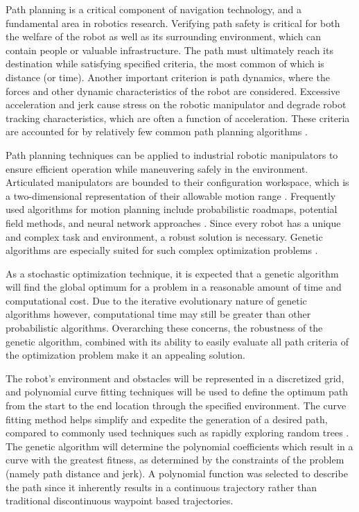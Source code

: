 Path planning is a critical component of navigation technology, and a fundamental area in robotics research. Verifying path safety is critical for both the welfare of the robot as well as its surrounding environment, which can contain people or valuable infrastructure. The path must ultimately reach its destination while satisfying specified criteria, the most common of which is distance (or time). Another important criterion is path dynamics, where the forces and other dynamic characteristics of the robot are considered. Excessive acceleration and jerk cause stress on the robotic manipulator and degrade robot tracking characteristics, which are often a function of acceleration. These criteria are accounted for by relatively few common path planning algorithms \cite{elshamli04}.

Path planning techniques can be applied to industrial robotic manipulators to ensure efficient operation while maneuvering safely in the environment. Articulated manipulators are bounded to their configuration workspace, which is a two-dimensional representation of their allowable motion range \cite{kavraki96}. Frequently used algorithms for motion planning include probabilistic roadmaps, potential field methods, and neural network approaches \cite{sharir89,khosla88,rimon92,yang00}. Since every robot has a unique and complex task and environment, a robust solution is necessary. Genetic algorithms are especially suited for such complex optimization problems \cite{renner03}.

As a stochastic optimization technique, it is expected that a genetic algorithm will find the global optimum for a problem in a reasonable amount of time and computational cost. Due to the iterative evolutionary nature of genetic algorithms however, computational time may still be greater than other probabilistic algorithms. Overarching these concerns, the robustness of the genetic algorithm, combined with its ability to easily evaluate all path criteria of the optimization problem make it an appealing solution.

The robot's environment and obstacles will be represented in a discretized grid, and polynomial curve fitting techniques will be used to define the optimum path from the start to the end location through the specified environment. The curve fitting method helps simplify and expedite the generation of a desired path, compared to commonly used techniques such as rapidly exploring random trees \cite{rodriguez06}. The genetic algorithm will determine the polynomial coefficients which result in a curve with the greatest fitness, as determined by the constraints of the problem (namely path distance and jerk). A polynomial function was selected to describe the path since it inherently results in a continuous trajectory rather than traditional discontinuous waypoint based trajectories.

